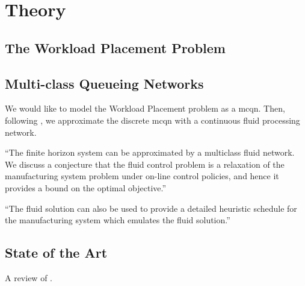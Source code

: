 \documentclass[11pt,a4paper,titlepage]{article}
\theoremstyle{definition}
\theoremstyle{plain}
\begin{document}
\section{Theory}
\label{sec:theory}

\subsection{The Workload Placement Problem}
\label{subsec:theory:workload-placement}

\subsection{Multi-class Queueing Networks}
\label{subsec:theory:mcqn}

We would like to model the Workload Placement problem as a \gls{mcqn}.
Then,
following \autocite{weiss1999scheduling},
we approximate the discrete \gls{mcqn} with a continuous fluid processing network.

``The finite horizon system can be approximated by a multiclass fluid network. We discuss a conjecture that the fluid control problem is a relaxation of the manufacturing system problem under on-line control policies, and hence it provides a bound on the optimal objective.''

``The fluid solution can also be used to provide a detailed heuristic schedule for the manufacturing system which emulates the fluid solution.''


\subsection{State of the Art}
\label{subsec:theory:state_of_the_art}

A review of \autocite{bertsimas2014robust}.
\end{document}
